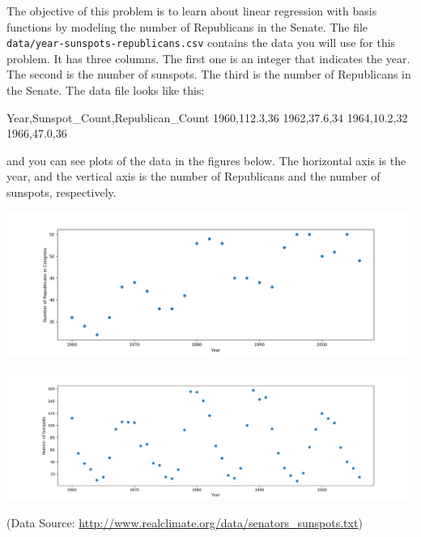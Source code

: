 \documentclass[submit]{harvardml}
\begin{document}
\begin{problem}
  
 The objective of this problem is to learn about linear regression
 with basis functions by modeling the number of Republicans in the
 Senate. The file \verb|data/year-sunspots-republicans.csv| contains the
 data you will use for this problem.  It has three columns.  The first
 one is an integer that indicates the year.  The second is the number
 of sunspots.  The third is the number of Republicans in the Senate.
 The data file looks like this:
 \begin{csv}
Year,Sunspot_Count,Republican_Count
1960,112.3,36
1962,37.6,34
1964,10.2,32
1966,47.0,36
\end{csv}
and you can see plots of the data in the figures below.  The horizontal axis is the year, and the vertical axis is the number of Republicans and the number of sunspots, respectively.

\begin{center}
\includegraphics[width=.7\textwidth]{data/year-republicans}
\end{center}

\begin{center}
\includegraphics[width=.7\textwidth]{data/year-sunspots}
\end{center}

(Data Source: \url{http://www.realclimate.org/data/senators_sunspots.txt})\\

\begin{enumerate}


\end{enumerate}
\end{problem}
\end{document}
